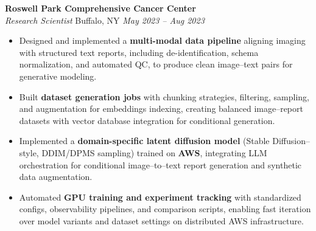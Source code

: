 \vspace*{-1pt}
\item \textbf{Roswell Park Comprehensive Cancer Center}\\
\textit{Research Scientist} \hfill Buffalo, NY \quad \textit{May 2023 -- Aug 2023}
\vspace*{-3pt}
\begin{itemize}[leftmargin=0.2in, topsep=1pt]
  \item Designed and implemented a \textbf{multi-modal data pipeline} aligning imaging with structured text reports, including de-identification, schema normalization, and automated QC, to produce clean image–text pairs for generative modeling.
  \item Built \textbf{dataset generation jobs} with chunking strategies, filtering, sampling, and augmentation for embeddings indexing, creating balanced image–report datasets with vector database integration for conditional generation.
  \item Implemented a \textbf{domain-specific latent diffusion model} (Stable Diffusion–style, DDIM/DPMS sampling) trained on \textbf{AWS}, integrating LLM orchestration for conditional image–to–text report generation and synthetic data augmentation.
  \item Automated \textbf{GPU training and experiment tracking} with standardized configs, observability pipelines, and comparison scripts, enabling fast iteration over model variants and dataset settings on distributed AWS infrastructure.
\end{itemize}
